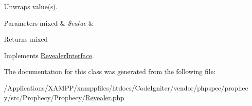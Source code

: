 Unwraps value(s).


\begin{DoxyParams}[1]{Parameters}
mixed & {\em \$value} & \\
\hline
\end{DoxyParams}
\begin{DoxyReturn}{Returns}
mixed 
\end{DoxyReturn}


Implements \mbox{\hyperlink{interface_prophecy_1_1_prophecy_1_1_revealer_interface_a2164ede43027e2eff4dc1419222839f5}{Revealer\+Interface}}.



The documentation for this class was generated from the following file\+:\begin{DoxyCompactItemize}
\item 
/\+Applications/\+X\+A\+M\+P\+P/xamppfiles/htdocs/\+Code\+Igniter/vendor/phpspec/prophecy/src/\+Prophecy/\+Prophecy/\mbox{\hyperlink{_revealer_8php}{Revealer.\+php}}\end{DoxyCompactItemize}
